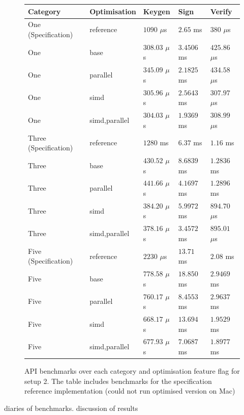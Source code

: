\documentclass[11pt]{report}
\theoremstyle{definition}
\theoremstyle{plain}
\begin{document}
\begin{figure}
  \centering
  \begin{tabular}{l|l|lll}
    \hline
    Category              & Optimisation  & Keygen          & Sign        & Verify          \\
    \hline
    \hline
    One (Specification)   & reference     & $1090$ $\mu$s   & $2.65$ ms   & $380$ $\mu$s    \\
    \arrayrulecolor{lightgray}\hline\arrayrulecolor{black}
    One                   & base          & $308.03$ $\mu$s & $3.4506$ ms & $425.86$ $\mu$s \\
    One                   & parallel      & $345.09$ $\mu$s & $2.1825$ ms & $434.58$ $\mu$s \\
    One                   & simd          & $305.96$ $\mu$s & $2.5643$ ms & $307.97$ $\mu$s \\
    One                   & simd,parallel & $304.03$ $\mu$s & $1.9369$ ms & $308.99$ $\mu$s \\
    \hline
    Three (Specification) & reference     & $1280$ ms       & $6.37$ ms   & $1.16$ ms       \\
    \arrayrulecolor{lightgray}\hline\arrayrulecolor{black}
    Three                 & base          & $430.52$ $\mu$s & $8.6839$ ms & $1.2836$ ms     \\
    Three                 & parallel      & $441.66$ $\mu$s & $4.1697$ ms & $1.2896$ ms     \\
    Three                 & simd          & $384.20$ $\mu$s & $5.9972$ ms & $894.70$ $\mu$s \\
    Three                 & simd,parallel & $378.16$ $\mu$s & $3.4572$ ms & $895.01$ $\mu$s \\
    \hline
    Five (Specification)  & reference     & $2230$ $\mu$s   & $13.71$ ms  & $2.08$ ms       \\
    \arrayrulecolor{lightgray}\hline\arrayrulecolor{black}
    Five                  & base          & $778.58$ $\mu$s & $18.850$ ms & $2.9469$ ms     \\
    Five                  & parallel      & $760.17$ $\mu$s & $8.4553$ ms & $2.9637$ ms     \\
    Five                  & simd          & $668.17$ $\mu$s & $13.694$ ms & $1.9529$ ms     \\
    Five                  & simd,parallel & $677.93$ $\mu$s & $7.0687$ ms & $1.8977$ ms     \\
    \hline
  \end{tabular}
  \caption{API benchmarks over each category and optimisation feature flag for setup 2. The table includes benchmarks for the specification reference implementation (could not run optimised version on Mac) }\label{fig:api_benchmarks_mac}
\end{figure}
diaries of benchmarks.
discussion of results
\end{document}
